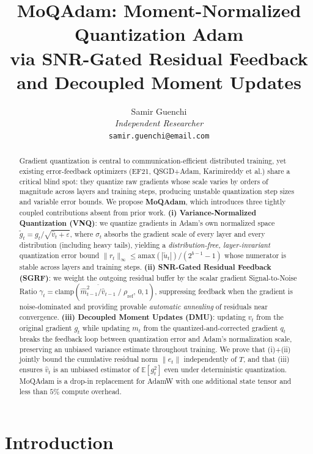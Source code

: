 \documentclass[10pt,twocolumn]{article}
\title{\textbf{MoQAdam: Moment-Normalized Quantization Adam\\
via SNR-Gated Residual Feedback and Decoupled Moment Updates}}
\author{
Samir Guenchi\\
\textit{Independent Researcher}\\
\texttt{samir.guenchi@email.com}
}
\date{}
\begin{document}
\maketitle

\begin{abstract}
Gradient quantization is central to communication-efficient distributed
training, yet existing error-feedback optimizers (EF21, QSGD+Adam,
Karimireddy et al.) share a critical blind spot: they quantize raw
gradients whose scale varies by orders of magnitude across layers and
training steps, producing unstable quantization step sizes and variable
error bounds.  We propose \textbf{MoQAdam}, which introduces three
tightly coupled contributions absent from prior work.
\textbf{(i) Variance-Normalized Quantization (VNQ)}: we quantize
gradients in Adam's own normalized space $\tilde{g}_t = g_t /
\sqrt{\hat{v}_t + \varepsilon}$, where $\sigma_t$ absorbs the gradient
scale of every layer and every distribution (including heavy tails),
yielding a \emph{distribution-free, layer-invariant} quantization
error bound $\|r_t\|_\infty \le \mathrm{amax}(|\tilde{u}_t|)/(2^{b-1}-1)$
whose numerator is stable across layers and training steps.
\textbf{(ii) SNR-Gated Residual Feedback (SGRF)}: we weight the
outgoing residual buffer by the scalar gradient Signal-to-Noise Ratio
$\gamma_t = \mathrm{clamp}(\overline{\hat{m}^2_{t-1}/\hat{v}_{t-1}} \;/\;
\rho_{\text{ref}},\, 0, 1)$, suppressing feedback when the gradient is
noise-dominated and providing provable \emph{automatic annealing} of
residuals near convergence.
\textbf{(iii) Decoupled Moment Updates (DMU)}: updating $v_t$ from the
original gradient $g_t$ while updating $m_t$ from the
quantized-and-corrected gradient $q_t$ breaks the feedback loop between
quantization error and Adam's normalization scale, preserving an
unbiased variance estimate throughout training.
We prove that (i)+(ii) jointly bound the cumulative residual norm $\|e_t\|$
independently of $T$, and that (iii) ensures $\hat{v}_t$ is an unbiased
estimator of $\mathbb{E}[g_t^2]$ even under deterministic quantization.
MoQAdam is a drop-in replacement for AdamW with one additional state
tensor and less than $5\%$ compute overhead.
\end{abstract}

\section{Introduction}
\end{document}
